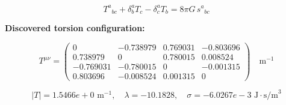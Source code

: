 
\begin{equation}
  T^a{}_{bc} + \delta^a_b T_c - \delta^a_c T_b = 8\pi G \, s^a{}_{bc}
\end{equation}

\textbf{Discovered torsion configuration:}

\begin{equation}
  T^{\mu\nu} = \begin{pmatrix}
    0 & -0.738979 & 0.769031 & -0.803696 \\
    0.738979 & 0 & 0.780015 & 0.008524 \\
    -0.769031 & -0.780015 & 0 & -0.001315 \\
    0.803696 & -0.008524 & 0.001315 & 0
  \end{pmatrix} \quad \text{m}^{-1}
\end{equation}

\begin{equation}
  |T| = 1.5466e+0 \text{ m}^{-1}, \quad
  \lambda = -10.1828, \quad
  \sigma = -6.0267e-3 \text{ J}\cdot\text{s/m}^3
\end{equation}